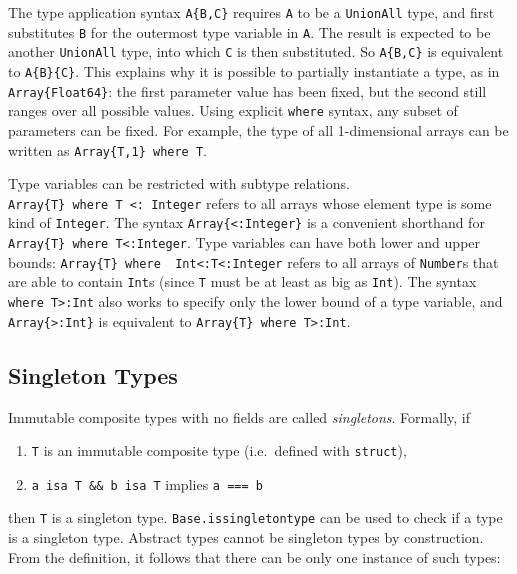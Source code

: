 \documentclass[
]{article}
\providecommand{\tightlist}{%
  \setlength{\itemsep}{0pt}\setlength{\parskip}{0pt}}
\begin{document}
The type application syntax \texttt{A\{B,C\}} requires \texttt{A} to be
a \texttt{UnionAll} type, and first substitutes \texttt{B} for the
outermost type variable in \texttt{A}. The result is expected to be
another \texttt{UnionAll} type, into which \texttt{C} is then
substituted. So \texttt{A\{B,C\}} is equivalent to \texttt{A\{B\}\{C\}}.
This explains why it is possible to partially instantiate a type, as in
\texttt{Array\{Float64\}}: the first parameter value has been fixed, but
the second still ranges over all possible values. Using explicit
\texttt{where} syntax, any subset of parameters can be fixed. For
example, the type of all 1-dimensional arrays can be written as
\texttt{Array\{T,1\}\ where\ T}.

Type variables can be restricted with subtype relations.
\texttt{Array\{T\}\ where\ T\ \textless{}:\ Integer} refers to all
arrays whose element type is some kind of \texttt{Integer}. The syntax
\texttt{Array\{\textless{}:Integer\}} is a convenient shorthand for
\texttt{Array\{T\}\ where\ T\textless{}:Integer}. Type variables can
have both lower and upper bounds:
\texttt{Array\{T\}\ where\ \ Int\textless{}:T\textless{}:Integer} refers
to all arrays of \texttt{Number}s that are able to contain \texttt{Int}s
(since \texttt{T} must be at least as big as \texttt{Int}). The syntax
\texttt{where\ T\textgreater{}:Int} also works to specify only the lower
bound of a type variable, and \texttt{Array\{\textgreater{}:Int\}} is
equivalent to \texttt{Array\{T\}\ where\ T\textgreater{}:Int}.

\hypertarget{singleton-types}{%
\subsection{Singleton Types}\label{singleton-types}}

Immutable composite types with no fields are called \emph{singletons}.
Formally, if

\begin{enumerate}
\def\labelenumi{\arabic{enumi}.}
\tightlist
\item
  \texttt{T} is an immutable composite type (i.e.~defined with
  \texttt{struct}),
\item
  \texttt{a\ isa\ T\ \&\&\ b\ isa\ T} implies \texttt{a\ ===\ b}
\end{enumerate}

then \texttt{T} is a singleton type. \texttt{Base.issingletontype} can
be used to check if a type is a singleton type. Abstract types cannot be
singleton types by construction. From the definition, it follows that
there can be only one instance of such types:
\end{document}
